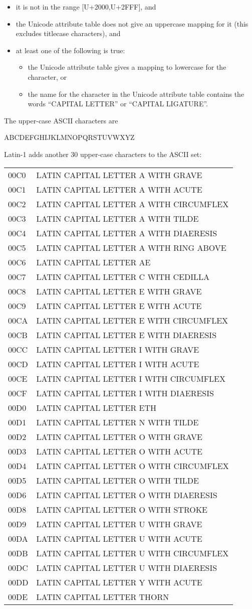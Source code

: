 \begin{itemize}
\tightlist
\item
  it is not in the range {[}U+2000,U+2FFF{]}, and
\item
  the Unicode attribute table does not give an uppercase mapping for it
  (this excludes titlecase characters), and
\item
  at least one of the following is true:

  \begin{itemize}
  \tightlist
  \item
    the Unicode attribute table gives a mapping to lowercase for the
    character, or
  \item
    the name for the character in the Unicode attribute table contains
    the words ``CAPITAL LETTER'' or ``CAPITAL LIGATURE''.
  \end{itemize}
\end{itemize}

The upper-case ASCII characters are

ABCDEFGHIJKLMNOPQRSTUVWXYZ

Latin-1 adds another 30 upper-case characters to the ASCII set:

\begin{longtable}[]{@{}ll@{}}
\toprule
00C0 & LATIN CAPITAL LETTER A WITH GRAVE\tabularnewline
00C1 & LATIN CAPITAL LETTER A WITH ACUTE\tabularnewline
00C2 & LATIN CAPITAL LETTER A WITH CIRCUMFLEX\tabularnewline
00C3 & LATIN CAPITAL LETTER A WITH TILDE\tabularnewline
00C4 & LATIN CAPITAL LETTER A WITH DIAERESIS\tabularnewline
00C5 & LATIN CAPITAL LETTER A WITH RING ABOVE\tabularnewline
00C6 & LATIN CAPITAL LETTER AE\tabularnewline
00C7 & LATIN CAPITAL LETTER C WITH CEDILLA\tabularnewline
00C8 & LATIN CAPITAL LETTER E WITH GRAVE\tabularnewline
00C9 & LATIN CAPITAL LETTER E WITH ACUTE\tabularnewline
00CA & LATIN CAPITAL LETTER E WITH CIRCUMFLEX\tabularnewline
00CB & LATIN CAPITAL LETTER E WITH DIAERESIS\tabularnewline
00CC & LATIN CAPITAL LETTER I WITH GRAVE\tabularnewline
00CD & LATIN CAPITAL LETTER I WITH ACUTE\tabularnewline
00CE & LATIN CAPITAL LETTER I WITH CIRCUMFLEX\tabularnewline
00CF & LATIN CAPITAL LETTER I WITH DIAERESIS\tabularnewline
00D0 & LATIN CAPITAL LETTER ETH\tabularnewline
00D1 & LATIN CAPITAL LETTER N WITH TILDE\tabularnewline
00D2 & LATIN CAPITAL LETTER O WITH GRAVE\tabularnewline
00D3 & LATIN CAPITAL LETTER O WITH ACUTE\tabularnewline
00D4 & LATIN CAPITAL LETTER O WITH CIRCUMFLEX\tabularnewline
00D5 & LATIN CAPITAL LETTER O WITH TILDE\tabularnewline
00D6 & LATIN CAPITAL LETTER O WITH DIAERESIS\tabularnewline
00D8 & LATIN CAPITAL LETTER O WITH STROKE\tabularnewline
00D9 & LATIN CAPITAL LETTER U WITH GRAVE\tabularnewline
00DA & LATIN CAPITAL LETTER U WITH ACUTE\tabularnewline
00DB & LATIN CAPITAL LETTER U WITH CIRCUMFLEX\tabularnewline
00DC & LATIN CAPITAL LETTER U WITH DIAERESIS\tabularnewline
00DD & LATIN CAPITAL LETTER Y WITH ACUTE\tabularnewline
00DE & LATIN CAPITAL LETTER THORN\tabularnewline
\bottomrule
\end{longtable}

